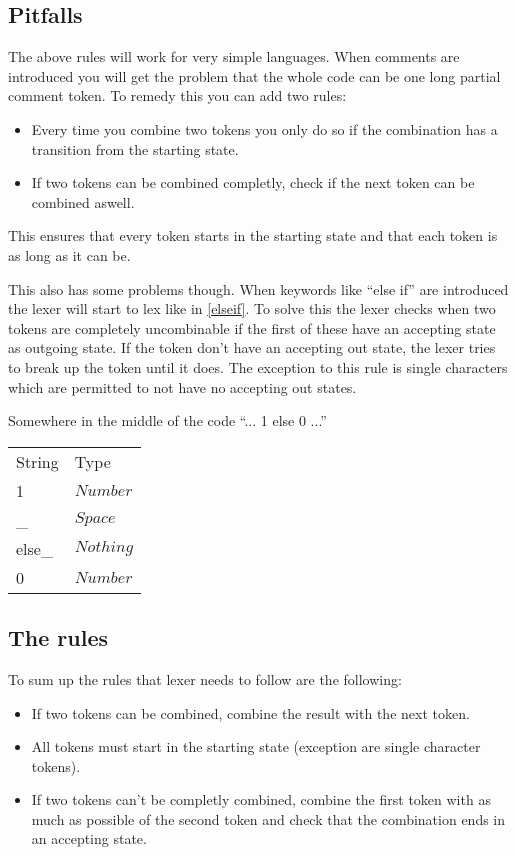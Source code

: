 \subsection{Pitfalls}
The above rules will work for very simple languages. When comments are
introduced you will get the problem that the whole code can be one long partial
comment token. To remedy this you can add two rules:
\begin{itemize}
\item Every time you combine two tokens you only do so if the combination has a
transition from the starting state.
\item If two tokens can be combined completly, check if the next token can be
combined aswell.
\end{itemize}
This ensures that every token starts in the starting state and that each token
is as long as it can be.

This also has some problems though. When keywords like ``else if'' are
introduced the lexer will start to lex like in \cref{elseif}. To solve this the
lexer checks when two tokens are completely uncombinable if the first of these
have an accepting state as outgoing state. If the token don't have an accepting
out state, the lexer tries to break up the token until it does. The exception to
this rule is single characters which are permitted to not have no accepting out
states.
\begin{example}\label{elseif}
Somewhere in the middle of the code ``... 1 else 0 ...''
\begin{center}
\begin{tabular}{ll}
String & Type\\
1 & $Number$\\
\_ & $Space$\\
else\_ & $Nothing$\\
0 & $Number$\\
\end{tabular}
\end{center}
\end{example}
\subsection{The rules}
To sum up the rules that lexer needs to follow are the following:
\begin{itemize}
\item If two tokens can be combined, combine the result with the next token.
\item All tokens must start in the starting state (exception are single
character tokens).
\item If two tokens can't be completly combined, combine the first token with as
much as possible of the second token and check that the combination ends in an
accepting state.
\end{itemize}

